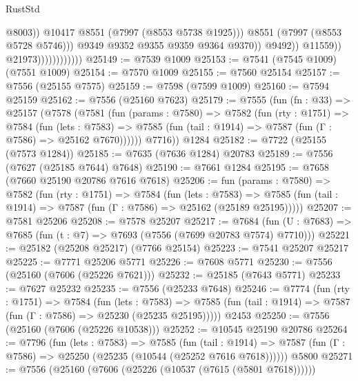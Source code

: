 \begin{lexlean}{RustStd}
\begin{coremodule}
{\begin{coremodule}
{{{{{{{{{{{{{{{{{{{{{{{{{{{{{{{{{{{{{{{{{{{                                                @8003))
                                            @10417
                                            @8551
                                            (@7997 (@8553 @5738 @1925)))
                                          @8551
                                          (@7997 (@8553 @5728 @5746)))
                                        @9349
                                        @9352
                                        @9355
                                        @9359
                                        @9364
                                        @9370))
                                    @9492))
                                @11559))
                            @21973))))))))))))
@25149 := @7539 @1009
@25153 := @7541 (@7545 @1009) (@7551 @1009)
@25154 := @7570 @1009
@25155 := @7560 @25154
@25157 := @7556 (@25155 @7575)
@25159 := @7598 (@7599 @1009)
@25160 := @7594 @25159
@25162 := @7556 (@25160 @7623)
@25179 := @7555
    (fun (fn : @33) =>
    @25157
      (@7578
        (@7581
          (fun (params : @7580) =>
          @7582
            (fun (rty : @1751) =>
            @7584
              (fun (lets : @7583) =>
              @7585 (fun (tail : @1914) => @7587 (fun (Γ : @7586) => @25162 @7670))))))
        @7716))
    @1284
@25182 := @7722 (@25155 (@7573 @1284))
@25185 := @7635 (@7636 @1284) @20783
@25189 := @7556 (@7627 (@25185 @7644) @7648)
@25190 := @7661 @1284
@25195 := @7658 (@7660 @25190 @20786 @7616 @7618)
@25206 := fun (params : @7580) =>
  @7582
    (fun (rty : @1751) =>
    @7584
      (fun (lets : @7583) =>
      @7585 (fun (tail : @1914) => @7587 (fun (Γ : @7586) => @25162 (@25189 @25195)))))
@25207 := @7581 @25206
@25208 := @7578 @25207
@25217 := @7684
    (fun (U : @7683) => @7685 (fun (t : @7) => @7693 (@7556 (@7699 @20783 @7574) @7710)))
@25221 := @25182 (@25208 @25217) (@7766 @25154)
@25223 := @7541 @25207 @25217
@25225 := @7771 @25206 @5771
@25226 := @7608 @5771
@25230 := @7556 (@25160 (@7606 (@25226 @7621)))
@25232 := @25185 (@7643 @5771)
@25233 := @7627 @25232
@25235 := @7556 (@25233 @7648)
@25246 := @7774
    (fun (rty : @1751) =>
    @7584
      (fun (lets : @7583) =>
      @7585 (fun (tail : @1914) => @7587 (fun (Γ : @7586) => @25230 (@25235 @25195)))))
    @2453
@25250 := @7556 (@25160 (@7606 (@25226 @10538)))
@25252 := @10545 @25190 @20786
@25264 := @7796
    (fun (lets : @7583) =>
    @7585
      (fun (tail : @1914) =>
      @7587 (fun (Γ : @7586) => @25250 (@25235 (@10544 (@25252 @7616 @7618))))))
    @5800
@25271 := @7556 (@25160 (@7606 (@25226 (@10537 (@7615 (@5801 @7618))))))
}}}}}}}}}}}}}}}}}}}}}}}}}}}}}}}}}}}}}}}}}}}
\end{coremodule}}
\end{coremodule}
\end{lexlean}
